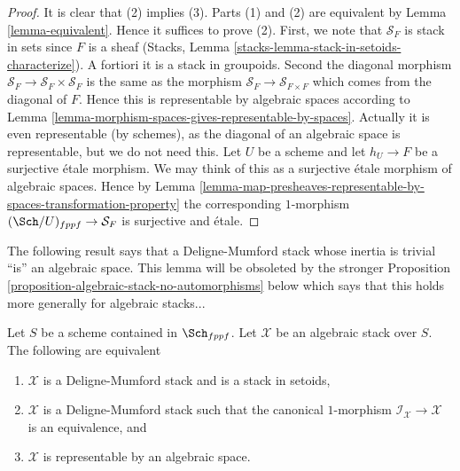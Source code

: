 \begin{proof}
It is clear that (2) implies (3).
Parts (1) and (2) are equivalent by Lemma \ref{lemma-equivalent}.
Hence it suffices to prove (2).
First, we note that $\mathcal{S}_F$ is stack in sets since
$F$ is a sheaf (Stacks, Lemma
\ref{stacks-lemma-stack-in-setoids-characterize}).
A fortiori it is a stack in groupoids. Second the diagonal
morphism $\mathcal{S}_F \to \mathcal{S}_F  \times \mathcal{S}_F$
is the same as the morphism $\mathcal{S}_F \to \mathcal{S}_{F \times F}$
which comes from the diagonal of $F$. Hence this is representable
by algebraic spaces according to
Lemma \ref{lemma-morphism-spaces-gives-representable-by-spaces}.
Actually it is even representable (by schemes), as the diagonal of
an algebraic space is representable, but we do not need this.
Let $U$ be a scheme and let $h_U \to F$ be a surjective \'etale morphism.
We may think of this as a surjective \'etale morphism of algebraic spaces.
Hence by
Lemma
\ref{lemma-map-presheaves-representable-by-spaces-transformation-property}
the corresponding $1$-morphism $(\Sch/U)_{fppf} \to \mathcal{S}_F$
is surjective and \'etale.
\end{proof}

\noindent
The following result says that a Deligne-Mumford stack whose inertia
is trivial ``is'' an algebraic space. This lemma will be obsoleted by
the stronger
Proposition \ref{proposition-algebraic-stack-no-automorphisms}
below which says that this holds more generally for algebraic stacks...

\begin{lemma}
\label{lemma-algebraic-stack-no-automorphisms}
Let $S$ be a scheme contained in $\Sch_{fppf}$.
Let $\mathcal{X}$ be an algebraic stack over $S$.
The following are equivalent
\begin{enumerate}
\item $\mathcal{X}$ is a Deligne-Mumford stack and is a stack in setoids,
\item $\mathcal{X}$ is a Deligne-Mumford stack such that the
canonical $1$-morphism $\mathcal{I}_\mathcal{X} \to \mathcal{X}$
is an equivalence, and
\item $\mathcal{X}$ is representable by an algebraic space.
\end{enumerate}
\end{lemma}

